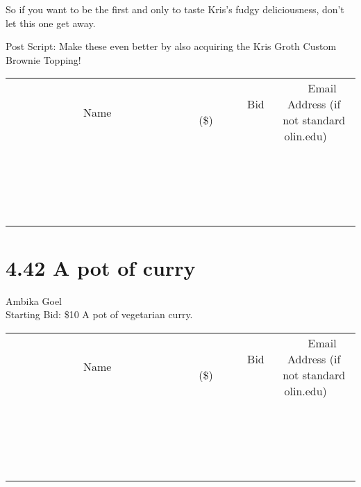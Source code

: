 \documentclass[11pt]{article}
\begin{document}
So if you want to be the first and only to taste Kris's fudgy deliciousness, don't let this one get away.

Post Script: Make these even better by also acquiring the Kris Groth Custom Brownie Topping!
\\[3ex]
\begin{tabular}{c c c}
~~~~~~~~~~~~~Name~~~~~~~~~~~~~ & ~~~~~~~~~Bid (\$)~~~~~~~~~  & ~~~Email Address (if not standard olin.edu)~~~\\
 & & \\
\hline
 & & \\
\hline
 & & \\
\hline
 & & \\
\hline
 & & \\
\hline
 & & \\
\hline
 & & \\
\hline
 & & \\
\hline
 & & \\
\hline
 & & \\
\hline
 & & \\
\hline
 & & \\
\hline
 & & \\
\hline
 & & \\
\hline
 & & \\
\hline
 & & \\
\hline
 & & \\
\hline
 & & \\
\hline
 & & \\
\hline
\end{tabular}
\newpage
\section*{4.42 A pot of curry}
Ambika Goel
\\
Starting Bid: \$10
\newline
A pot of vegetarian curry.
\\[3ex]
\begin{tabular}{c c c}
~~~~~~~~~~~~~Name~~~~~~~~~~~~~ & ~~~~~~~~~Bid (\$)~~~~~~~~~  & ~~~Email Address (if not standard olin.edu)~~~\\
 & & \\
\hline
 & & \\
\hline
 & & \\
\hline
 & & \\
\hline
 & & \\
\hline
 & & \\
\hline
 & & \\
\hline
 & & \\
\hline
 & & \\
\hline
 & & \\
\hline
 & & \\
\hline
 & & \\
\hline
 & & \\
\hline
 & & \\
\hline
 & & \\
\hline
 & & \\
\hline
 & & \\
\hline
 & & \\
\hline
 & & \\
\hline
\end{tabular}
\newpage
\end{document}
